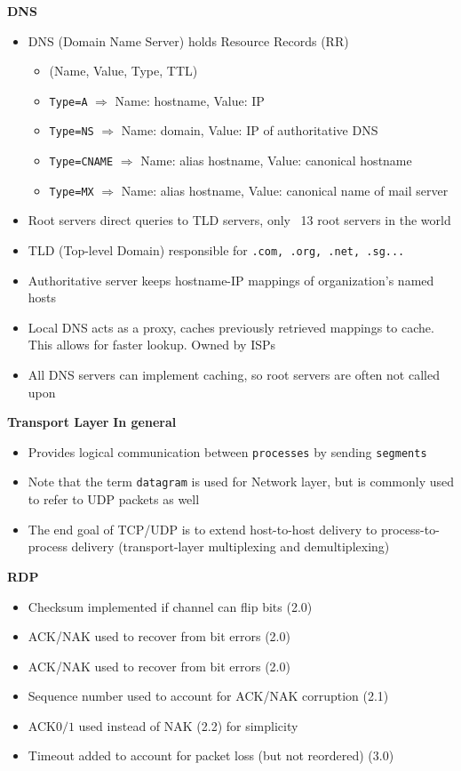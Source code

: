\documentclass[a4paper]{article} \usepackage[backend=biber, style=numeric, sorting=none]{biblatex}
\begin{document}
\begin{multicols*}{4}
\textbf{DNS}
\begin{itemize}[leftmargin=*]
\item DNS (Domain Name Server) holds Resource Records (RR)
  \begin{itemize}[leftmargin=*]
  \item (Name, Value, Type, TTL)
  \item \texttt{Type=A} $\Rightarrow$ Name: hostname, Value: IP
  \item \texttt{Type=NS} $\Rightarrow$ Name: domain, Value: IP of authoritative DNS
  \item \texttt{Type=CNAME} $\Rightarrow$ Name: alias hostname, Value: canonical hostname
  \item \texttt{Type=MX} $\Rightarrow$ Name: alias hostname, Value: canonical name of mail server
  \end{itemize}
\item Root servers direct queries to TLD servers, only ~13 root servers in the world
\item TLD (Top-level Domain) responsible for \texttt{.com, .org, .net, .sg...}
\item Authoritative server keeps hostname-IP mappings of organization's named hosts
\item Local DNS acts as a proxy, caches previously retrieved mappings to cache. This allows for faster lookup. Owned by ISPs
\item All DNS servers can implement caching, so root servers are often not called upon
\end{itemize}

{\small\textbf{Transport Layer}}
\textbf{In general}
\begin{itemize}[leftmargin=*]
\item Provides logical communication between \texttt{processes} by sending \texttt{segments}
\item Note that the term \texttt{datagram} is used for Network layer, but is commonly used to refer to UDP packets as well
\item The end goal of TCP/UDP is to extend host-to-host delivery to process-to-process delivery (transport-layer multiplexing and demultiplexing)
\end{itemize}

\textbf{RDP}
\begin{itemize}[leftmargin=*]
\item Checksum implemented if channel can flip bits (2.0)
\item ACK/NAK used to recover from bit errors (2.0)
\item ACK/NAK used to recover from bit errors (2.0)
\item Sequence number used to account for ACK/NAK corruption (2.1)
\item ACK$0/1$ used instead of NAK (2.2) for simplicity
\item Timeout added to account for packet loss (but not reordered) (3.0)
\end{itemize}


\end{multicols*}
\end{document}
